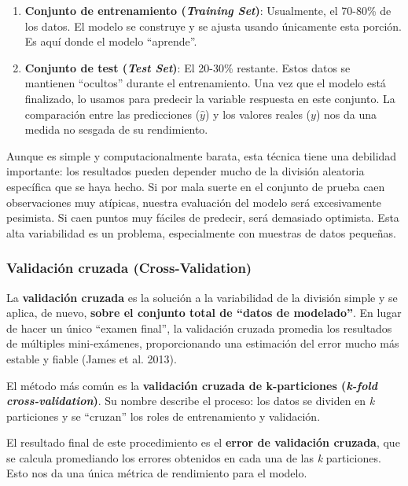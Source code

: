 \documentclass[
  letterpaper,
  DIV=11,
  numbers=noendperiod]{scrreprt}
\providecommand{\tightlist}{%
  \setlength{\itemsep}{0pt}\setlength{\parskip}{0pt}}
\begin{document}
\begin{enumerate}
\def\labelenumi{\arabic{enumi}.}
\tightlist
\item
  \textbf{Conjunto de entrenamiento (\emph{Training Set})}: Usualmente,
  el 70-80\% de los datos. El modelo se construye y se ajusta usando
  únicamente esta porción. Es aquí donde el modelo ``aprende''.
\item
  \textbf{Conjunto de test (\emph{Test Set})}: El 20-30\% restante.
  Estos datos se mantienen ``ocultos'' durante el entrenamiento. Una vez
  que el modelo está finalizado, lo usamos para predecir la variable
  respuesta en este conjunto. La comparación entre las predicciones
  (\(\hat{y}\)) y los valores reales (\(y\)) nos da una medida no
  sesgada de su rendimiento.
\end{enumerate}

Aunque es simple y computacionalmente barata, esta técnica tiene una
debilidad importante: los resultados pueden depender mucho de la
división aleatoria específica que se haya hecho. Si por mala suerte en
el conjunto de prueba caen observaciones muy atípicas, nuestra
evaluación del modelo será excesivamente pesimista. Si caen puntos muy
fáciles de predecir, será demasiado optimista. Esta alta variabilidad es
un problema, especialmente con muestras de datos pequeñas.

\subsubsection{Validación cruzada
(Cross-Validation)}\label{validaciuxf3n-cruzada-cross-validation}

La \textbf{validación cruzada} es la solución a la variabilidad de la
división simple y se aplica, de nuevo, \textbf{sobre el conjunto total
de ``datos de modelado''}. En lugar de hacer un único ``examen final'',
la validación cruzada promedia los resultados de múltiples
mini-exámenes, proporcionando una estimación del error mucho más estable
y fiable (James et al. 2013).

El método más común es la \textbf{validación cruzada de k-particiones
(\emph{k-fold cross-validation})}. Su nombre describe el proceso: los
datos se dividen en \emph{k} particiones y se ``cruzan'' los roles de
entrenamiento y validación.

El resultado final de este procedimiento es el \textbf{error de
validación cruzada}, que se calcula promediando los errores obtenidos en
cada una de las \emph{k} particiones. Esto nos da una única métrica de
rendimiento para el modelo.
\end{document}
